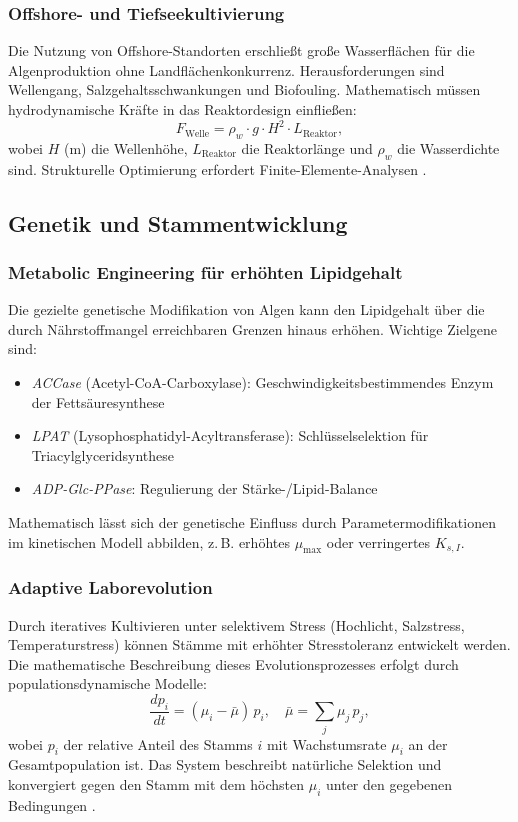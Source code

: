 ﻿\documentclass[a4paper,12pt]{article}
\theoremstyle{definition}
\begin{document}
\subsubsection{Offshore- und Tiefseekultivierung}

Die Nutzung von Offshore-Standorten erschließt große Wasserflächen für die
Algenproduktion ohne Landflächenkonkurrenz. Herausforderungen sind
Wellengang, Salzgehaltsschwankungen und Biofouling. Mathematisch müssen
hydrodynamische Kräfte in das Reaktordesign einfließen:
\[
	F_\mathrm{Welle} = \rho_w \cdot g \cdot H^2 \cdot L_\mathrm{Reaktor},
\]
wobei $H$ (m) die Wellenhöhe, $L_\mathrm{Reaktor}$ die Reaktorlänge und
$\rho_w$ die Wasserdichte sind. Strukturelle Optimierung erfordert
Finite-Elemente-Analysen \cite{chisti2007}.

\subsection{Genetik und Stammentwicklung}

\subsubsection{Metabolic Engineering für erhöhten Lipidgehalt}

Die gezielte genetische Modifikation von Algen kann den Lipidgehalt über
die durch Nährstoffmangel erreichbaren Grenzen hinaus erhöhen. Wichtige
Zielgene sind:
\begin{itemize}
	\item \textit{ACCase} (Acetyl-CoA-Carboxylase): Geschwindigkeitsbestimmendes
	      Enzym der Fettsäuresynthese
	\item \textit{LPAT} (Lysophosphatidyl-Acyltransferase): Schlüsselselektion
	      für Triacylglyceridsynthese
	\item \textit{ADP-Glc-PPase}: Regulierung der Stärke-/Lipid-Balance
\end{itemize}
Mathematisch lässt sich der genetische Einfluss durch Parametermodifikationen
im kinetischen Modell abbilden, z.\,B. erhöhtes $\mu_\mathrm{max}$ oder
verringertes $K_{s,I}$.

\subsubsection{Adaptive Laborevolution}

Durch iteratives Kultivieren unter selektivem Stress (Hochlicht, Salzstress,
Temperaturstress) können Stämme mit erhöhter Stresstoleranz entwickelt werden.
Die mathematische Beschreibung dieses Evolutionsprozesses erfolgt durch
populationsdynamische Modelle:
\[
	\frac{d p_i}{dt} = (\mu_i - \bar\mu)\,p_i,\quad \bar\mu = \sum_j \mu_j\,p_j,
\]
wobei $p_i$ der relative Anteil des Stamms $i$ mit Wachstumsrate $\mu_i$
an der Gesamtpopulation ist. Das System beschreibt natürliche Selektion und
konvergiert gegen den Stamm mit dem höchsten $\mu_i$ unter den gegebenen
Bedingungen \cite{richmond2004}.
\end{document}
